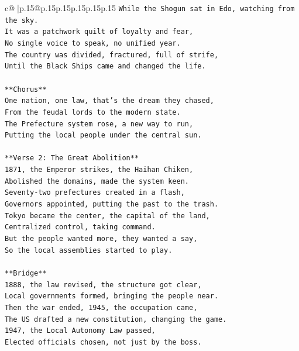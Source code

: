 \documentclass{article}
\begin{document}
{\begin{supertabular}{c@{$\;$}|p{.15\linewidth}@{}p{.15\linewidth}p{.15\linewidth}p{.15\linewidth}p{.15\linewidth}p{.15\linewidth}}
{{{\texttt{While the Shogun sat in Edo, watching from the sky.} \\
\texttt{It was a patchwork quilt of loyalty and fear,} \\
\texttt{No single voice to speak, no unified year.} \\
\texttt{The country was divided, fractured, full of strife,} \\
\texttt{Until the Black Ships came and changed the life.} \\
\\ 
\texttt{**Chorus**} \\
\texttt{One nation, one law, that's the dream they chased,} \\
\texttt{From the feudal lords to the modern state.} \\
\texttt{The Prefecture system rose, a new way to run,} \\
\texttt{Putting the local people under the central sun.} \\
\\ 
\texttt{**Verse 2: The Great Abolition**} \\
\texttt{1871, the Emperor strikes, the Haihan Chiken,} \\
\texttt{Abolished the domains, made the system keen.} \\
\texttt{Seventy{-}two prefectures created in a flash,} \\
\texttt{Governors appointed, putting the past to the trash.} \\
\texttt{Tokyo became the center, the capital of the land,} \\
\texttt{Centralized control, taking command.} \\
\texttt{But the people wanted more, they wanted a say,} \\
\texttt{So the local assemblies started to play.} \\
\\ 
\texttt{**Bridge**} \\
\texttt{1888, the law revised, the structure got clear,} \\
\texttt{Local governments formed, bringing the people near.} \\
\texttt{Then the war ended, 1945, the occupation came,} \\
\texttt{The US drafted a new constitution, changing the game.} \\
\texttt{1947, the Local Autonomy Law passed,} \\
\texttt{Elected officials chosen, not just by the boss.} \\
}}}
\end{supertabular}}
\end{document}
